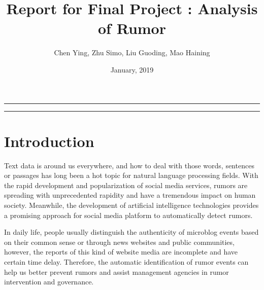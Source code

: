 \documentclass[12pt,a4paper]{article}
\author{Chen Ying, Zhu Simo, Liu Guoding, Mao Haining}
\title{\textbf{Report for Final Project : Analysis of Rumor}}
\date{January, 2019}
\begin{document}
\thispagestyle{plain}
\newcommand{\xiaosi}{\fontsize{12pt}{18pt}\selectfont}
\newcommand{\h}{\begin{tabular}{|c|c|}\hline\end{tabular}}
\newcommand{\rd}{\mathrm{d}}
\newcommand{\dps}[1]{\displaystyle{#1}}
\newcommand{\tabincell}[2]{\begin{tabular}{@{}#1@{}}#2\end{tabular}}
\newcommand{\noindentpar}{\hangafter=1 \setlength{\hangindent}{2em}\noindent}


\newcommand{\fn}[1]{\normalfont{#1}}
\newcommand{\fc}[1]{\fontspec{Consolas}\small{#1}\fn{}}
\renewcommand{\'}{\fc{'}\fn{}}
\newcommand{\ns}{\normalsize}
\renewcommand{\contentsname}{Contents}
\maketitle
\vspace{20pt}
\rule[-10pt]{15cm}{0.05em}
\vspace{-5pt}
\tableofcontents
\vspace{-5pt}
\rule[-10pt]{15cm}{0.05em}
\clearpage
\section{Introduction}
Text data is around us everywhere, and how to deal with those words, sentences or passages has long been a hot topic for natural language processing fields. With the rapid development and popularization of social media services, rumors are spreading with unprecedented rapidity and have a tremendous impact on human society. Meanwhile, the development of artificial intelligence technologies provides a promising approach for social media platform to automatically detect rumors. 

In daily life, people usually distinguish the authenticity of microblog events based on their common sense or through news websites and public communities, however, the reports of this kind of website media are incomplete and have certain time delay. Therefore, the automatic identification of rumor events can help us better prevent rumors and assist management agencies in rumor intervention and governance.
\end{document}
